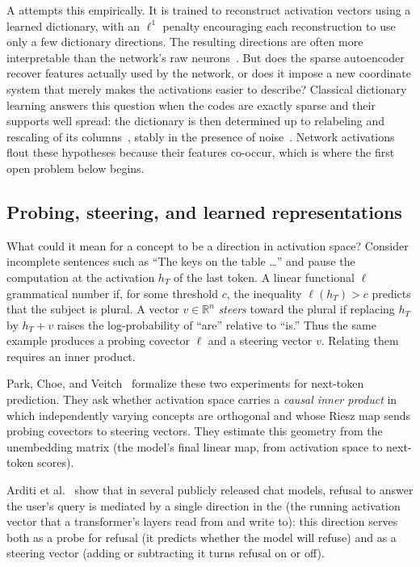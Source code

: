 A  attempts this empirically.
It is trained to reconstruct activation vectors using a learned dictionary,
with an $\ell^1$ penalty encouraging each reconstruction to use only a few
dictionary directions.
The resulting directions are often more interpretable than the network's raw
neurons~\cite{bricken2023,cunningham2023}.
But does the sparse autoencoder
recover features actually used by the network, or does it impose a new
coordinate system that merely makes the activations easier to describe?
Classical dictionary learning answers this question when the codes are
exactly sparse and their supports well spread: the dictionary is then
determined up to relabeling and rescaling of its
columns~\cite{aharon2006,hillar2015}, stably in the presence of
noise~\cite{gribonval2015,garfinkle2019}.
Network activations flout these hypotheses because their features co-occur,
which is where the first open problem below begins.

\subsection{Probing, steering, and learned representations}

What could it mean for a concept to be a direction in activation space?
Consider incomplete sentences such as ``The keys on the table \ldots'' and
pause the computation at the activation $h_T$ of the last token.
A linear functional $\ell$ \emph{} grammatical number if, for some
threshold $c$, the inequality $\ell(h_T)>c$ predicts that the subject is
plural.
A vector $v\in\mathbb{R}^n$ \emph{steers} toward the plural if replacing
$h_T$ by $h_T+v$ raises the log-probability of ``are'' relative to ``is.''
Thus the same example produces a probing covector $\ell$ and a steering
vector $v$.
Relating them requires an inner product.

Park, Choe, and Veitch~\cite{park2023} formalize these two experiments for
next-token prediction.
They ask whether activation space carries a \emph{causal inner product}
in which independently varying concepts are orthogonal and whose Riesz map
sends probing covectors to steering vectors.
They estimate this geometry from the unembedding matrix
(the model's final linear map, from activation space to next-token
scores).

Arditi et al.~\cite{arditi2024} show that in several publicly released chat models, refusal to answer the user's query is mediated by a single direction in the  (the running activation vector that a transformer's layers read from and write to): this direction serves both as a probe for refusal (it predicts whether the model will refuse) and as a steering vector (adding or subtracting it turns refusal on or off).

